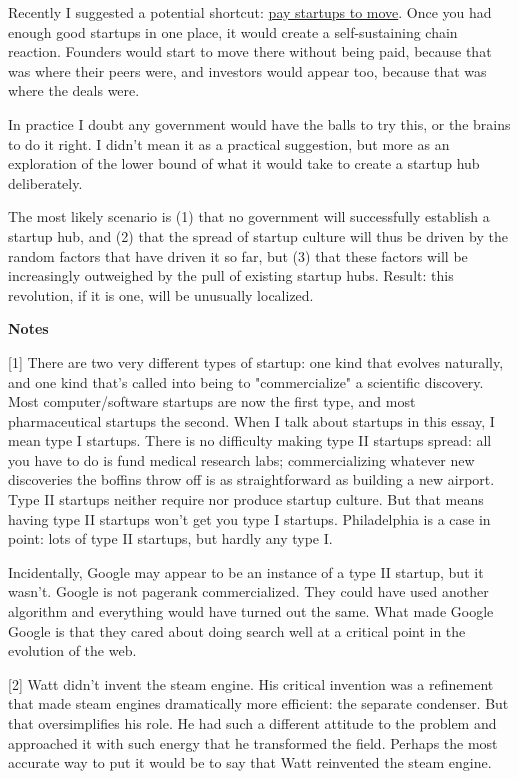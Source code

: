 Recently I suggested a potential shortcut: 
\href{http://www.paulgraham.com/maybe.html}{pay startups to move}.  Once you had enough good startups in one place, it would create a self-sustaining chain reaction.  Founders would start to move there without being paid, because that was where their peers were, and investors would appear too, because that was where the deals were.

In practice I doubt any government would have the balls to try this, or the brains to do it right.  I didn't mean it as a practical suggestion, but more as an exploration of the lower bound of what it would take to create a startup hub deliberately.

The most likely scenario is (1) that no government will successfully establish a startup hub, and (2) that the spread of startup culture will thus be driven by the random factors that have driven it so far, but (3) that these factors will be increasingly outweighed by the pull of existing startup hubs.  Result: this revolution, if it is one, will be unusually localized.






\textbf{Notes}

[1]
There are two very different types of startup: one kind that evolves naturally, and one kind that's called into being to "commercialize" a scientific discovery.  Most computer/software startups are now the first type, and most pharmaceutical startups the second.  When I talk about startups in this essay, I mean type I startups.  There is no difficulty making type II startups spread: all you have to do is fund medical research labs; commercializing whatever new discoveries the boffins throw off is as straightforward as building a new airport.  Type II startups neither require nor produce startup culture. But that means having type II startups won't get you type I startups.  Philadelphia is a case in point: lots of type II startups, but hardly any type I.

Incidentally, Google may appear to be an instance of a type II startup, but it wasn't.  Google is not pagerank commercialized.  They could have used another algorithm and everything would have turned out the same.  What made Google Google is that they cared about doing search well at a critical point in the evolution of the web.

[2]
 Watt didn't invent the steam engine.  His critical invention was a refinement that made steam engines dramatically more efficient: the separate condenser.  But that oversimplifies his role.  He had such a different attitude to the problem and approached it with such energy that he transformed the field.  Perhaps the most accurate way to put it would be to say that Watt reinvented the steam engine.

